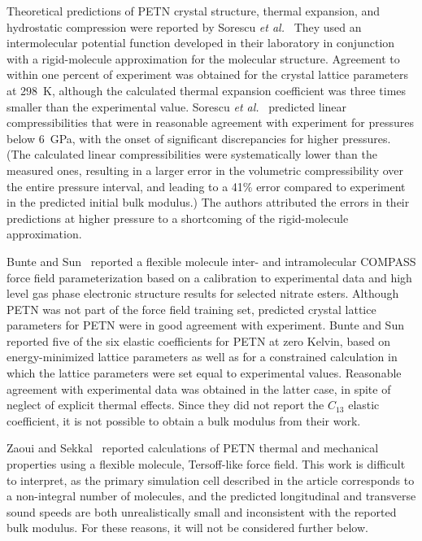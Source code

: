 \documentclass[prb,aps,nobibnotes,twocolumn,doublespace,twocolumngrid,superbib]{revtex4}
\begin{document}
Theoretical predictions of PETN crystal structure, thermal expansion,
and hydrostatic compression were reported by Sorescu {\it et
al.}~\cite{Sorescu_1999v103A, Sorescu_1999v103} They used an
intermolecular potential function developed in their laboratory
in conjunction with a rigid-molecule 
approximation for the molecular structure. Agreement to within one percent 
of experiment was obtained for the crystal lattice parameters at 298~K, although
the calculated thermal expansion coefficient was three times smaller than the
experimental value.  Sorescu {\it et al.}~\cite{Sorescu_1999v103}
predicted linear compressibilities that were in reasonable agreement
with experiment for pressures below 6~GPa, with the onset of
significant discrepancies for higher pressures.  (The calculated
linear compressibilities were systematically lower than the measured
ones, resulting in a larger error in the volumetric compressibility
over the entire pressure interval, and leading to a 41\% error
compared to experiment in the predicted initial bulk modulus.) The
authors attributed the errors in their predictions at higher pressure
to a shortcoming of the rigid-molecule approximation.

Bunte and Sun~\cite{Bunte_2000v104} reported a flexible molecule
inter- and intramolecular COMPASS force field parameterization based
on a calibration to experimental data and high level gas phase
electronic structure results for selected nitrate esters.  Although
PETN was not part of the force field training set, predicted crystal
lattice parameters for PETN were in good agreement with experiment.
Bunte and Sun reported five of the six elastic coefficients for PETN
at zero Kelvin, based on energy-minimized lattice parameters as well
as for a constrained calculation in which the lattice parameters were
set equal to experimental values.  Reasonable agreement with
experimental data was obtained in the latter case, in spite of neglect
of explicit thermal effects.  Since they did not report the $C_{13}$
elastic coefficient, it is not possible to obtain a bulk modulus from
their work.

Zaoui and Sekkal~\cite{Zaoui_2001v118} reported calculations of PETN
thermal and mechanical properties using a flexible molecule, Tersoff-like force
field.  This work is difficult to interpret, as the primary simulation
cell described in the article corresponds to a non-integral number of
molecules, and the predicted longitudinal and transverse sound speeds
are both unrealistically small and inconsistent with the reported bulk
modulus.  For these reasons, it will not be considered further below.
\end{document}
